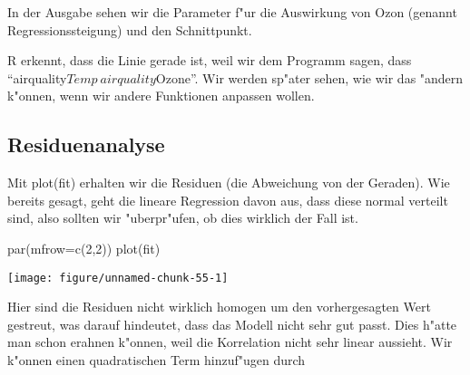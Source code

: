 \documentclass[a4paper,twoside]{tufte-book}\usepackage[]{graphicx}\usepackage[]{color}
\makeatletter
\def\maxwidth{ %
  \ifdim\Gin@nat@width>\linewidth
    \linewidth
  \else
    \Gin@nat@width
  \fi
}
\makeatother
\begin{document}
\begin{appendices}
\begin{Schunk}
\end{Schunk}

In der Ausgabe sehen wir die Parameter f"ur die Auswirkung von Ozon (genannt Regressionssteigung) und den Schnittpunkt.

R erkennt, dass die Linie gerade ist, weil wir dem Programm sagen, dass "`airquality$Temp~airquality$Ozone"'. Wir werden sp"ater sehen, wie wir das "andern k"onnen, wenn wir andere Funktionen anpassen wollen. 

\subsection{Residuenanalyse}

Mit plot(fit) erhalten wir die Residuen (die Abweichung von der Geraden). Wie bereits gesagt, geht die lineare Regression davon aus, dass diese normal verteilt sind, also sollten wir "uberpr"ufen, ob dies wirklich der Fall ist.

\begin{Schunk}
\begin{Sinput}
par(mfrow=c(2,2))
plot(fit)
\end{Sinput}

\texttt{[image: figure/unnamed-chunk-55-1]} \end{Schunk}

Hier sind die Residuen nicht wirklich homogen um den vorhergesagten Wert gestreut, was darauf hindeutet, dass das Modell nicht sehr gut passt. Dies h"atte man schon erahnen k"onnen, weil die Korrelation nicht sehr linear aussieht. Wir k"onnen einen quadratischen Term hinzuf"ugen durch


\begin{Schunk}
\begin{Soutput}


\end{Soutput}
\end{Schunk}
\end{appendices}
\end{document}
